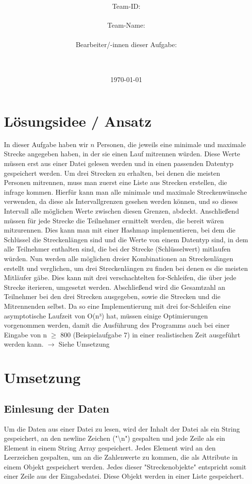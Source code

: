 \documentclass[a4paper,10pt,ngerman]{scrartcl}
\title{\textbf{\Huge\Aufgabe}}
\author{\LARGE Team-ID: \LARGE \TeamId \\\\
	    \LARGE Team-Name: \LARGE \TeamName \\\\
	    \LARGE Bearbeiter/-innen dieser Aufgabe: \\ 
	    \LARGE \Namen\\\\}
\date{\LARGE\today}
\begin{document}
\maketitle
\tableofcontents

\vspace{0.5cm}

\section{Lösungsidee / Ansatz}
In dieser Aufgabe haben wir $n$ Personen, die jeweils eine minimale und maximale Strecke angegeben haben, in der sie einen Lauf mitrennen würden. Diese Werte müssen erst aus einer Datei gelesen werden und in einen passenden Datentyp gespeichert werden.
Um drei Strecken zu erhalten, bei denen die meisten Personen mitrennen, muss man zuerst eine Liste aus Strecken erstellen, die infrage kommen. Hierfür kann man alle minimale und maximale Streckenwünsche verwenden,
da diese als Intervallgrenzen gesehen werden können, und so dieses Intervall alle möglichen Werte zwischen diesen Grenzen, abdeckt. Anschließend müssen für jede Strecke die Teilnehmer ermittelt werden, die bereit wären mitzurennen.  
Dies kann man mit einer Hashmap implementieren, bei dem die Schlüssel die Streckenlängen sind und die Werte von einem Datentyp sind, in dem alle Teilnehmer enthalten sind, die bei der Strecke (Schlüsselwert) mitlaufen würden. 
Nun werden alle möglichen dreier Kombinationen an Streckenlängen erstellt und verglichen, um drei Streckenlängen zu finden bei denen es die meisten Mitläufer gäbe. Dies kann mit drei verschachtelten for-Schleifen, die über jede Strecke iterieren, umgesetzt werden. 
Abschließend wird die Gesamtzahl an Teilnehmer bei den drei Strecken ausgegeben, sowie die Strecken und die Mitrennenden selbst.
\newline
Da so eine Implementierung mit drei for-Schleifen eine asymptotische Laufzeit von O(n³) hat, müssen einige Optimierungen vorgenommen werden, damit die Ausführung des Programms auch bei einer Eingabe von n $\geq$ 800 (Beispielaufgabe 7) in einer realistischen Zeit ausgeführt werden kann.
$\rightarrow$ Siehe Umsetzung


\section{Umsetzung}
\subsection{Einlesung der Daten}
Um die Daten aus einer Datei zu lesen, wird der Inhalt der Datei als ein String gespeichert, an den newline Zeichen ("\textbackslash n") gespalten und jede Zeile als ein Element in einem String Array gespeichert. Jedes Element wird an den Leerzeichen gespalten, um an die Zahlenwerte zu kommen, die als Attribute in einem 
Objekt gespeichert werden. Jedes dieser "Streckenobjekte" entspricht somit einer Zeile aus der Eingabedatei. Diese Objekt werden in einer Liste gespeichert.
\end{document}

